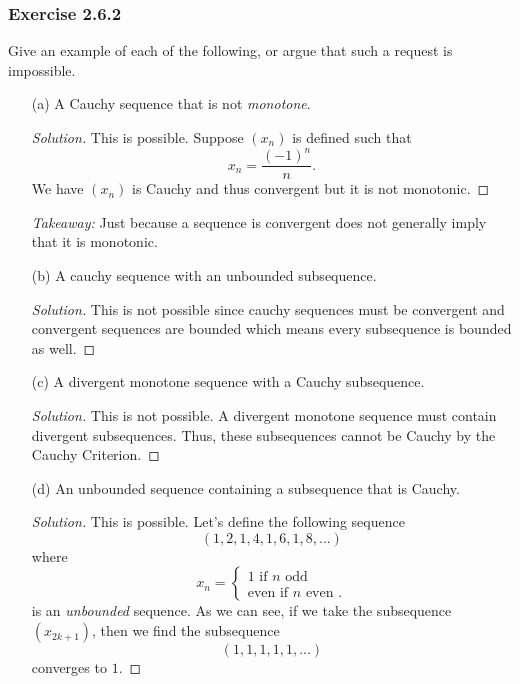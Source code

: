 \subsubsection{Exercise 2.6.2}
Give an example of each of the following, or argue that such a request is impossible.
\begin{enumerate}
    \item[(a)] A Cauchy sequence that is not \textit{monotone}. 
        \begin{proof}[Solution]
         This is possible. Suppose \((x_n)\) is defined such that 
         \[ x_n = \frac{(-1)^{n}}{n}.\]
         We have \((x_n)\) is Cauchy and thus convergent but it is not monotonic.
        \end{proof}
        \textit{Takeaway:} Just because a sequence is convergent does not generally imply that it is monotonic.
    \item[(b)] A cauchy sequence with an unbounded subsequence. 
        \begin{proof}[Solution]
        This is not possible since cauchy sequences must be convergent and convergent sequences are bounded which means every subsequence is bounded as well.   
        \end{proof}
    \item[(c)] A divergent monotone sequence with a Cauchy subsequence.
        \begin{proof}[Solution]
        This is not possible. A divergent monotone sequence must contain divergent subsequences. Thus, these subsequences cannot be Cauchy by the Cauchy Criterion. 
        \end{proof}
    \item[(d)] An unbounded sequence containing a subsequence that is Cauchy.
        \begin{proof}[Solution]
        This is possible. Let's define the following sequence 
        \[ (1,2,1,4,1,6,1,8,...)\] where
        \[ x_n =  
        \begin{cases}
            1 \text{ if } n \text{ odd} \\ 
            \text{even}  \text{ if } n \text{ even }.
        \end{cases}\]
        is an \textit{unbounded} sequence. 
        As we can see, if we take the subsequence \((x_{2k+1})\), then we find the subsequence 
        \[ (1,1,1,1,1,... )\]
        converges to \( 1\).
        \end{proof}
\end{enumerate}


